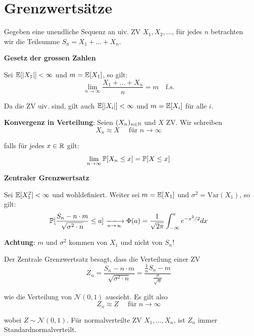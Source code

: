 \section{Grenzwertsätze}

Gegeben eine unendliche Sequenz an uiv. ZV $X_1, X_2,...$, für jedes $n$ betrachten wir die Teilsumme $S_n = X_1 + ... + X_n$.

\begin{tcolorbox}
    \textbf{Gesetz der grossen Zahlen} \smallskip
    
    Sei $\mathbb{E}[|X_1|] < \infty$ und $m = \mathbb{E}[X_1]$, so gilt:
    $$\lim_{n \to \infty} \frac{X_1 + ... + X_n}{n} = m \quad \text{f.s.}$$
\end{tcolorbox}

Da die ZV uiv. sind, gilt auch $\mathbb{E}[|X_i|] < \infty$ und $m = \mathbb{E}[X_i]$ für alle $i$. \medskip

\Satz \textbf{Konvergenz in Verteilung}: Seien $(X_n)_{n \in \mathbb{N}}$ und $X$ ZV. Wir schreiben
$$X_n \approx X \quad \text{ für } n \to \infty$$

falls für jedes $x \in \mathbb{R}$ gilt:
$$\lim_{n \to \infty} \mathbb{P}[X_n \leq x] = \mathbb{P}[X \leq x]$$

\begin{tcolorbox}
    \textbf{Zentraler Grenzwertsatz} \smallskip
    
    Sei $\mathbb{E}[X^2_1] < \infty$ und wohldefiniert. Weiter sei $m = \mathbb{E}[X_1]$ und $\sigma^2 = \text{Var}(X_1)$, so gilt:
    $$\Pm[ \frac{S_n - n \cdot m}{\sqrt{\sigma^2 \cdot n}} \leq a] \xlongrightarrow[n \to \infty]{} \Phi(a) = \frac{1}{\sqrt{2 \pi}} \int_{-\infty}^a e^{-x^2 / 2} dx$$
    
    \textbf{Achtung}: $m$ und $\sigma^2$ kommen von $X_1$ und nicht von $S_n$!
\end{tcolorbox}

Der Zentrale Grenzwertsatz besagt, dass die Verteilung einer ZV
$$Z_n = \frac{S_n - n \cdot m}{\sqrt{\sigma^2 \cdot n}} = \frac{\frac{1}{n} S_n - m}{\frac{\sigma}{\sqrt n}}$$

wie die Verteilung von $\mathcal{N}(0,1)$ aussieht. Es gilt also
$$Z_n \approx Z \quad \text{ für } n \to \infty$$

wobei $Z \sim \mathcal{N}(0,1)$. Für normalverteilte ZV $X_1,...,X_n$, ist $Z_n$ immer Standardnormalverteilt.
